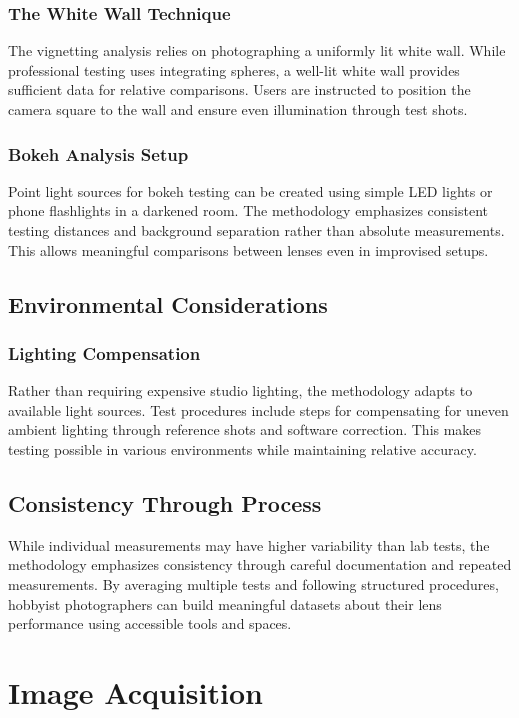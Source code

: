 \subsubsection{The White Wall Technique} %
The vignetting analysis relies on photographing a uniformly lit white wall. While professional testing uses integrating spheres, a well-lit white wall provides sufficient data for relative comparisons. Users are instructed to position the camera square to the wall and ensure even illumination through test shots.

\subsubsection{Bokeh Analysis Setup} 
Point light sources for bokeh testing can be created using simple LED lights or phone flashlights in a darkened room. The methodology emphasizes consistent testing distances and background separation rather than absolute measurements. This allows meaningful comparisons between lenses even in improvised setups.

\subsection{Environmental Considerations}

\subsubsection{Lighting Compensation}
Rather than requiring expensive studio lighting, the methodology adapts to available light sources. Test procedures include steps for compensating for uneven ambient lighting through reference shots and software correction. This makes testing possible in various environments while maintaining relative accuracy.

\subsection{Consistency Through Process} %
While individual measurements may have higher variability than lab tests, the methodology emphasizes consistency through careful documentation and repeated measurements. By averaging multiple tests and following structured procedures, hobbyist photographers can build meaningful datasets about their lens performance using accessible tools and spaces.

\section{Image Acquisition}

